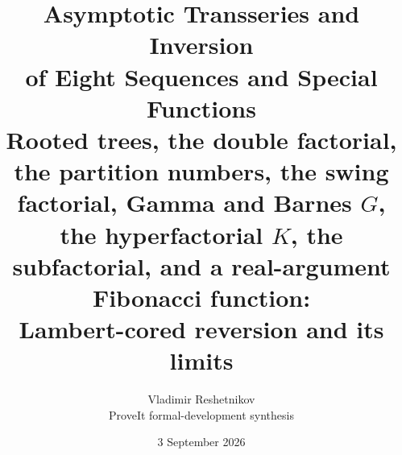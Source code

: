 \documentclass[11pt,a4paper,oneside]{book}
\theoremstyle{plain}
\theoremstyle{definition}
\theoremstyle{remark}
\begin{document}
\frontmatter

\title{\textbf{Asymptotic Transseries and Inversion\\ of Eight Sequences and Special Functions}\\[0.35em]
  \Large Rooted trees, the double factorial, the partition numbers, the swing
  factorial, Gamma and Barnes $G$, the hyperfactorial $K$, the subfactorial,
  and a real-argument Fibonacci function:\\
  Lambert-cored reversion and its limits}
\author{Vladimir Reshetnikov\\
  \small ProveIt formal-development synthesis}
\date{3 September 2026}

\maketitle
\end{document}
